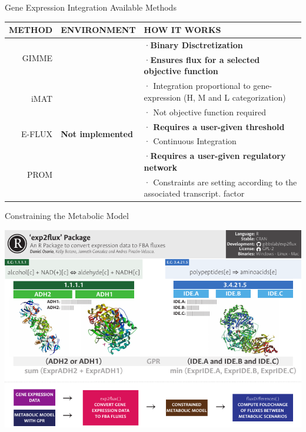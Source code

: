 \documentclass[11pt]{beamer}
\begin{document}
\begin{frame}{Gene Expression Integration Available Methods}
\begin{center}
\begin{tabular}{r|p{3cm}|p{4.7cm}}
\hline
\textbf{METHOD}&\textbf{ENVIRONMENT}&\textbf{HOW IT WORKS}\\
\hline
\hline
\multirow{2}{*}{GIMME}&\multirow{2}{*}{\parbox{3cm}{}}&·{\footnotesize \textbf{Binary Disctretization}}\\
&&·{\footnotesize  \textbf{Ensures flux for a selected objective function}}\\
\hline
\multirow{2}{*}{iMAT}&\multirow{2}{*}{\parbox{3cm}{}}&· {\footnotesize Integration proportional to gene-expression (H, M and L categorization)} \\
&&· {\footnotesize Not objective function required} \\
\hline
\multirow{2}{*}{E-FLUX}&\multirow{2}{*}{\textbf{Not implemented}}&· {\footnotesize \textbf{Requires a user-given threshold}}\\
&&· {\footnotesize  Continuous Integration}\\
\hline
\multirow{2}{*}{PROM}&\multirow{2}{*}{\parbox{3cm}{}}&·{\footnotesize \textbf{Requires a user-given regulatory network}}\\
&&· {\footnotesize Constraints are setting according to the associated transcript. factor}\\
\hline
\end{tabular}
\end{center}
\end{frame}
\begin{frame}{Constraining the Metabolic Model}
\begin{center}
\includegraphics[width=\textwidth]{exp2flux}
\end{center}
\end{frame}
\end{document}
